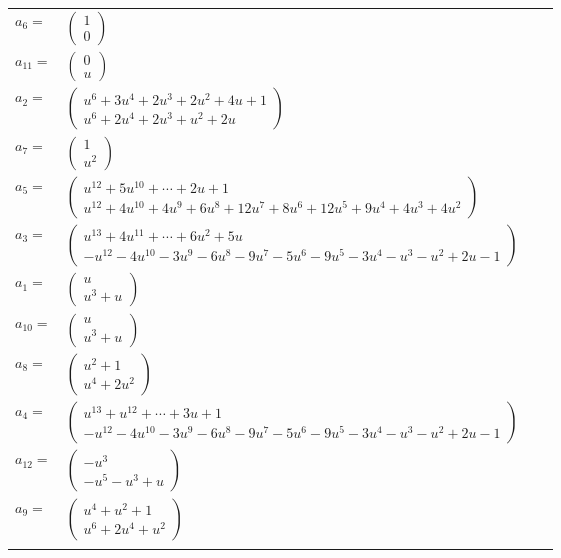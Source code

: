 \documentclass[1p]{elsarticle_modified}
\theoremstyle{definition}
\begin{document}
\begin{tabular}{m{7pt} m{180pt} m{7pt} m{180pt} }
\flushright $a_{6}=$&$\begin{pmatrix}1\\0\end{pmatrix}$ \\
\flushright $a_{11}=$&$\begin{pmatrix}0\\u\end{pmatrix}$ \\
\flushright $a_{2}=$&$\begin{pmatrix}u^6+3 u^4+2 u^3+2 u^2+4 u+1\\u^6+2 u^4+2 u^3+u^2+2 u\end{pmatrix}$ \\
\flushright $a_{7}=$&$\begin{pmatrix}1\\u^2\end{pmatrix}$ \\
\flushright $a_{5}=$&$\begin{pmatrix}u^{12}+5 u^{10}+\cdots+2 u+1\\u^{12}+4 u^{10}+4 u^9+6 u^8+12 u^7+8 u^6+12 u^5+9 u^4+4 u^3+4 u^2\end{pmatrix}$ \\
\flushright $a_{3}=$&$\begin{pmatrix}u^{13}+4 u^{11}+\cdots+6 u^2+5 u\\- u^{12}-4 u^{10}-3 u^9-6 u^8-9 u^7-5 u^6-9 u^5-3 u^4- u^3- u^2+2 u-1\end{pmatrix}$ \\
\flushright $a_{1}=$&$\begin{pmatrix}u\\u^3+u\end{pmatrix}$ \\
\flushright $a_{10}=$&$\begin{pmatrix}u\\u^3+u\end{pmatrix}$ \\
\flushright $a_{8}=$&$\begin{pmatrix}u^2+1\\u^4+2 u^2\end{pmatrix}$ \\
\flushright $a_{4}=$&$\begin{pmatrix}u^{13}+u^{12}+\cdots+3 u+1\\- u^{12}-4 u^{10}-3 u^9-6 u^8-9 u^7-5 u^6-9 u^5-3 u^4- u^3- u^2+2 u-1\end{pmatrix}$ \\
\flushright $a_{12}=$&$\begin{pmatrix}- u^3\\- u^5- u^3+u\end{pmatrix}$ \\
\flushright $a_{9}=$&$\begin{pmatrix}u^4+u^2+1\\u^6+2 u^4+u^2\end{pmatrix}$\\&\end{tabular}
\end{document}
